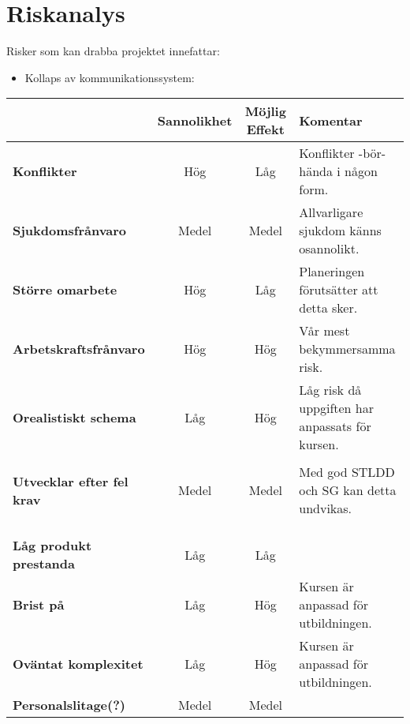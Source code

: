 \documentclass[paper=a4, fontsize=11pt,twoside]{article}
\begin{document}
\section{Riskanalys}

Risker som kan drabba projektet innefattar: 
\begin{itemize}
\item Kollaps av kommunikationssystem: {\color{red}{Vill diskutera}}
\end{itemize}

\begin{tabular}{| l | c | c | l |}
\hline
	& \textbf{Sannolikhet} & \textbf{Möjlig Effekt} & \textbf{Komentar} \\
\hline
\textbf{Konflikter} & Hög & Låg & Konflikter -bör- hända i någon form. \\
\hline
\textbf{Sjukdomsfrånvaro} & Medel & Medel & Allvarligare sjukdom känns osannolikt. \\
\hline
\textbf{Större omarbete} & Hög & Låg & Planeringen förutsätter att detta sker. \\
\hline
\textbf{Arbetskraftsfrånvaro} & Hög & Hög & Vår mest bekymmersamma risk. \\
\hline
\textbf{Orealistiskt schema} & Låg & Hög & Låg risk då uppgiften har anpassats för kursen.\\
 & & & {\color{red}{kommer inte risken från oss mer än kursen?}} \\
\hline
\textbf{Utvecklar efter fel krav} & Medel & Medel & Med god STLDD och SG kan detta undvikas. \\
{\color{red}{Funkioner}} & & &  \\
{\color{red}{Interface}} & & &  \\
{\color{red}{``Gold plating''}} & & &  \\
\hline
\textbf{Låg produkt prestanda} & Låg & Låg &  \\
\hline
\textbf{Brist på {\color{red}{kunskaper}}} & Låg & Hög & Kursen är anpassad för utbildningen. \\

\hline
\textbf{Oväntat komplexitet} & Låg & Hög & Kursen är anpassad för utbildningen.  \\
\hline
\textbf{Personalslitage(?)} & Medel & Medel &  \\
\hline

\end{tabular}
%	
\end{document}
